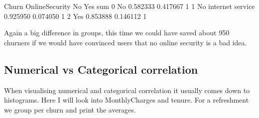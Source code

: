 \documentclass[letterpaper,10pt,english]{jupyterBook}
\begin{document}
\begin{sphinxVerbatim}[commandchars=\\\{\}]
Churn       OnlineSecurity        No       Yes  sum
0                       No  0.582333  0.417667    1
1      No internet service  0.925950  0.074050    1
2                      Yes  0.853888  0.146112    1
\end{sphinxVerbatim}

\begin{sphinxVerbatim}[commandchars=\\\{\}]
    
     
\end{sphinxVerbatim}

\noindent{}

\sphinxAtStartPar
Again a big difference in groups, this time we could have saved about 950 churners if we would have convinced users that no online security is a bad idea.


\subsection{Numerical vs Categorical correlation}
\label{\detokenize{c7_case_studies/Churn:id1}}
\sphinxAtStartPar
When visualising numerical and categorical correlation it usually comes down to histograms. Here I will look into MonthlyCharges and tenure.
For a refreshment we group per churn and print the averages.
\end{document}
